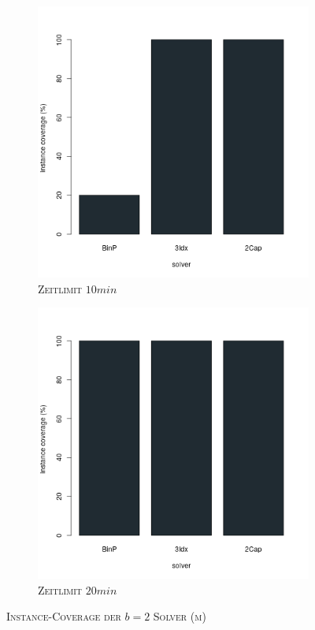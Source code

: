\begin{figure}[H]
\begin{subfigure}[b]{0.3\textwidth}
\includegraphics[width=1.2\textwidth]{img/solver_instance_coverage_b=2_m_600s.png}
\caption{\textsc{Zeitlimit} $10min$}
\label{fig:instance_cov_b=2_m_b}
\end{subfigure}
\hfill
\begin{subfigure}[b]{0.3\textwidth}
\centering
\includegraphics[width=1.2\textwidth]{img/solver_instance_coverage_b=2_m_1200s.png}
\caption{\textsc{Zeitlimit} $20min$}
\label{fig:instance_cov_b=2_m_c}
\end{subfigure}
\caption{\textsc{Instance-Coverage der $b=2$ Solver (m)}}
\label{fig:instance_cov_b=2}
\end{figure}


